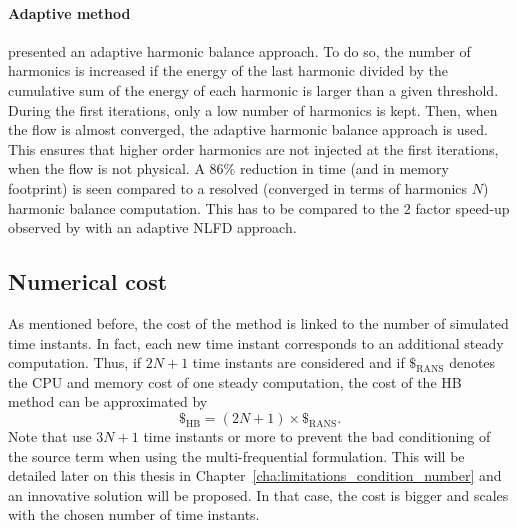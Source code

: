 \paragraph{Adaptive method}
\citet{Maple2004} presented an adaptive harmonic
balance approach. To do so, the number of harmonics is increased
if the energy of the last harmonic divided by the cumulative
sum of the energy of each harmonic is larger than a 
given threshold. During the first iterations, only
a low number of harmonics is kept. Then, when the flow
is almost converged, the adaptive harmonic balance
approach is used. This ensures that higher order harmonics
are not injected at the first iterations, when the
flow is not physical. A $86\%$ reduction in time (and
in memory footprint) is seen compared to a resolved (converged in
terms of harmonics $N$) harmonic
balance computation. This has to be compared to
the $2$ factor speed-up observed by \citet{Mosahebi2013}
with an adaptive NLFD approach.

\subsection{Numerical cost}
\label{sec:sm_hb_cost}
As mentioned before, the cost of the method is linked to
the number of simulated time instants.
In fact, each new time instant corresponds to an additional steady computation.
Thus, if \mbox{$2N+1$} time instants are considered and if $\mathdollar_{\text{RANS}}$ 
denotes the CPU and memory cost of
one steady computation, the cost of the HB method can be 
approximated by
\begin{equation}
	\mathdollar_{\text{HB}} = (2N+1) \times \mathdollar_{\text{RANS}}.
\end{equation}
Note that \citet{Ekici2007,Ekici2008a} use $3N+1$
time instants or more to prevent the bad conditioning of the
source term when using the multi-frequential formulation. 
This will be detailed later on this thesis in 
Chapter~\ref{cha:limitations_condition_number} and an innovative solution
will be proposed. In that
case, the cost is bigger and scales with the chosen number
of time instants.
